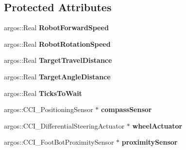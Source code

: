 \subsection*{Protected Attributes}
\begin{DoxyCompactItemize}
\item 
\hypertarget{classi_ant_base_controller_aafc10e20b7821b436b531d6990b2a559}{}argos\+::\+Real {\bfseries Robot\+Forward\+Speed}\label{classi_ant_base_controller_aafc10e20b7821b436b531d6990b2a559}

\item 
\hypertarget{classi_ant_base_controller_a265916e97aa2ef53fdcc7ef55cc55392}{}argos\+::\+Real {\bfseries Robot\+Rotation\+Speed}\label{classi_ant_base_controller_a265916e97aa2ef53fdcc7ef55cc55392}

\item 
\hypertarget{classi_ant_base_controller_af7e0f181fc802153261874a2ac1215e8}{}argos\+::\+Real {\bfseries Target\+Travel\+Distance}\label{classi_ant_base_controller_af7e0f181fc802153261874a2ac1215e8}

\item 
\hypertarget{classi_ant_base_controller_abdc7a2a7dcc12dddc798ea7a0a4cdfb6}{}argos\+::\+Real {\bfseries Target\+Angle\+Distance}\label{classi_ant_base_controller_abdc7a2a7dcc12dddc798ea7a0a4cdfb6}

\item 
\hypertarget{classi_ant_base_controller_af501676396763245c6dfb72888b279f4}{}argos\+::\+Real {\bfseries Ticks\+To\+Wait}\label{classi_ant_base_controller_af501676396763245c6dfb72888b279f4}

\item 
\hypertarget{classi_ant_base_controller_a8de3da5a56a5bc97aa79999bab12ecdd}{}argos\+::\+C\+C\+I\+\_\+\+Positioning\+Sensor $\ast$ {\bfseries compass\+Sensor}\label{classi_ant_base_controller_a8de3da5a56a5bc97aa79999bab12ecdd}

\item 
\hypertarget{classi_ant_base_controller_a7491fc4f9773de742e874c5708395c7d}{}argos\+::\+C\+C\+I\+\_\+\+Differential\+Steering\+Actuator $\ast$ {\bfseries wheel\+Actuator}\label{classi_ant_base_controller_a7491fc4f9773de742e874c5708395c7d}

\item 
\hypertarget{classi_ant_base_controller_ab7f6d73f7a5e97a16a637e227a90806f}{}argos\+::\+C\+C\+I\+\_\+\+Foot\+Bot\+Proximity\+Sensor $\ast$ {\bfseries proximity\+Sensor}\label{classi_ant_base_controller_ab7f6d73f7a5e97a16a637e227a90806f}

\end{DoxyCompactItemize}


